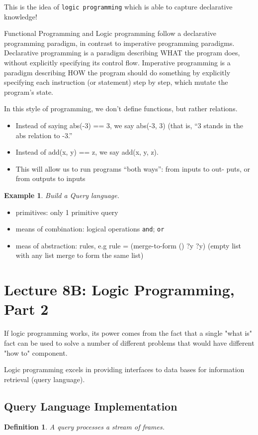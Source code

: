 \documentclass[a4paper,twoside]{article}
\newtheorem{example}[theorem]{Example}
\newtheorem{definition}[theorem]{Definition}
\numberwithin{equation}{section}
\begin{document}
This is the idea of \texttt{logic programming} which is able to capture declarative knowledge!

Functional Programming and Logic programming follow a declarative programming paradigm, in contrast to imperative programming paradigms.
Declarative programming is a paradigm describing WHAT the program does, without explicitly specifying its control flow.
Imperative programming is a paradigm describing HOW the program should do something by explicitly
specifying each instruction (or statement) step by step, which mutate the program's state.

In this style of programming, we don't define functions, but rather
relations.
\begin{itemize}
    \item Instead of saying abs(-3) == 3, we say abs(-3, 3) (that is, “3
        stands in the abs relation to -3.”
    \item Instead of add(x, y) == z, we say add(x, y, z).
    \item This will allow us to run programs “both ways”: from inputs to out-
        puts, or from outputs to inputs
\end{itemize}

\begin{example}
    Build a Query language.
\end{example}
\begin{itemize}
    \item primitives: only 1 primitive query
    \item means of combination: logical operations \texttt{and}; \texttt{or}
    \item meas of abstraction: rules, e.g rule = (merge-to-form () ?y ?y) (empty list with any
    list merge to form the same list)
\end{itemize}

\section{Lecture 8B: Logic Programming, Part 2}
If logic programming works, its power comes from the fact that a single "what is" fact can be
used to solve a number of different problems that would have different "how to" component.

Logic programming excels in providing interfaces to data bases for information retrieval (query language).

\subsection{Query Language Implementation}
\begin{definition}
    A query processes a stream of frames.
\end{definition}
\end{document}
